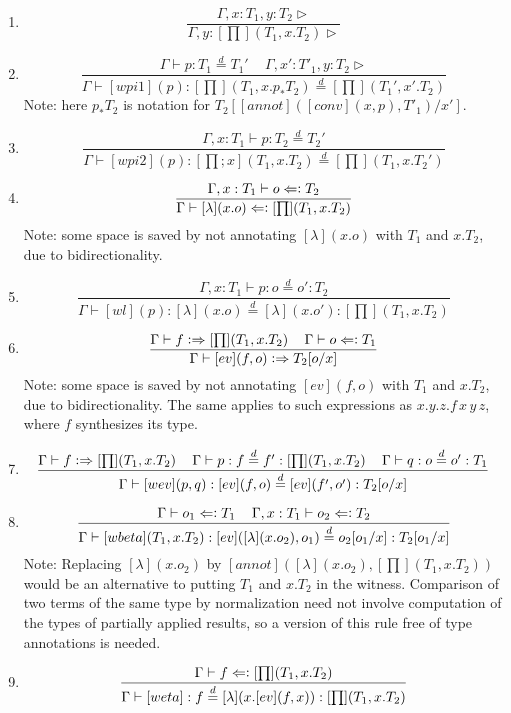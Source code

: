 \documentclass[11pt]{article}
\newcommand{\eqd}{\stackrel{d}{=}}
\newcommand{\spc}{{\,\,\,\,\,\,\,}}
\newcommand{\synth}{\vcentcolon\Rightarrow}
\newcommand{\force}{\Leftarrow\vcentcolon}
\begin{document}
\begin{enumerate}
\item 
$$\frac{\Gamma, x:T_1, y:T_2\rhd}{\Gamma, y:[\prod](T_1,x.T_2)\rhd}$$
\item 
$$\frac{ \Gamma\vdash p:T_1\eqd T_1' \spc \Gamma, x':T'_1,y: T_2\rhd}
       {\Gamma\vdash [wpi1](p):[\prod](T_1,x.p_* T_2)\eqd [\prod](T_1',x'.T_2)}$$
Note: here $p_*T_2$ is notation for $T_2[[annot]([conv](x,p),T'_1)/x']$.

\item 
$$\frac{\Gamma, x:T_1\vdash p:T_2\eqd T_2'}{\Gamma\vdash [wpi2](p):[\prod;x](T_1,x.T_2)\eqd [\prod](T_1,x.T_2')}$$

\item 
$$\frac{\Gamma, x : T_1\vdash o \force T_2}{\Gamma\vdash [\lambda](x.o) \force [\prod](T_1,x.T_2)}$$
Note: some space is saved by not annotating $[\lambda](x.o)$ with $T_1$ and $x.T_2$, due to bidirectionality.

\item 
$$\frac{\Gamma, x:T_1\vdash p : o\eqd o' : T_2}{\Gamma\vdash [wl](p) : [\lambda](x.o)\eqd [\lambda](x.o') : [\prod](T_1,x.T_2)}$$
\item 
$$\frac{\Gamma\vdash f \synth [\prod](T_1,x.T_2)\spc \Gamma\vdash o \force T_1}{\Gamma\vdash [ev](f,o) \synth T_2[o/x]}$$
Note: some space is saved by not annotating $[ev](f,o)$ with $T_1$ and $x.T_2$, due to bidirectionality.  The same applies to such expressions
as $x.y.z.f\, x\, y\, z$, where $f$ synthesizes its type.
\item 
$$\frac{\Gamma\vdash f \synth [\prod](T_1,x.T_2) \spc \Gamma\vdash p : f \eqd f' : [\prod](T_1,x.T_2)\spc \Gamma\vdash q : o \eqd o' : T_1}{\Gamma\vdash [wev](p,q) : [ev](f,o) \eqd [ev](f',o') : T_2[o/x]}$$
\item 
$$\frac{ \Gamma\vdash o_1 \force T_1\spc \Gamma, x:T_1\vdash o_2 \force T_2}{\Gamma\vdash [wbeta](T_1,x.T_2) : [ev]([\lambda](x.o_2),o_1) \eqd o_2[o_1/x] : T_2[o_1/x]}$$
Note: Replacing $[\lambda](x.o_2)$ by $[annot]([\lambda](x.o_2),[\prod](T_1,x.T_2))$ would be an alternative to putting $T_1$ and $x.T_2$ in the witness.
Comparison of two terms of the same type by normalization need not involve
computation of the types of partially applied results, so a version of this
rule free of type annotations is needed.
\item 
$$\frac{\Gamma\vdash f \force [\prod](T_1,x.T_2)}{\Gamma\vdash [weta] : f \eqd [\lambda](x.[ev](f,x)) : [\prod](T_1,x.T_2)}$$ 

\end{enumerate}



\end{document}

